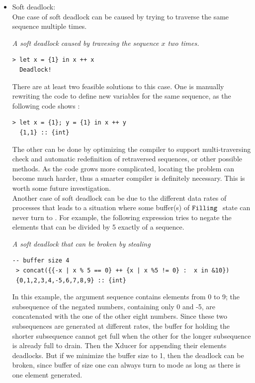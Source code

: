 \begin{itemize}

\item Soft deadlock: \\

One case of soft deadlock can be caused by trying to traverse the same sequence multiple times. 

\begin{example} \emph{A soft deadlock caused by travesing the sequence $x$ two times.} \label{eg:deadlock1}
\end{example}
	\begin{lstlisting}[style=nesl-style]
  > let x = {1} in x ++ x
  Deadlock!
\end{lstlisting}

There are at least two feasible solutions to this case.
One is manually rewriting the code to define new variables for the same sequence, as the following code shows :\\

\begin{lstlisting}[style=nesl-style]
  > let x = {1}; y = {1} in x ++ y
  {1,1} :: {int}
\end{lstlisting}


The other can be done by optimizing the compiler to support multi-traversing check and automatic 
redefinition of retraversed sequences, or other possible methods. 
As the code grows more complicated, locating the problem can become much harder, thus a smarter compiler is definitely necessary. 
This is worth some future investigation.\\


Another case of soft deadlock can be due to the different data rates of processes that leads to a situation where some buffer(s) of $\texttt{Filling} \ $ state can never turn to \draining. 
For example, the following expression tries to negate the elements that can be divided by 5 exactly of a sequence.
\begin{example}\emph{ A soft deadlock that can be broken by stealing}
\end{example}
\begin{lstlisting}[style=nesl-style]
  -- buffer size 4 
 > concat({{-x | x % 5 == 0} ++ {x | x %5 != 0} :  x in &10})
 {0,1,2,3,4,-5,6,7,8,9} :: {int}
\end{lstlisting}

In this example, the argument sequence contains elements from 0 to 9; the subsequence of the negated numbers, containing only 0 and -5, are concatenated with the one of the other eight numbers. 
Since these two subsequences are generated at different rates,
the buffer for holding the shorter subsequence cannot get full when the other for the longer subsequence is already full to drain.
Then the Xducer for appending their elements deadlocks.
But if we minimize the buffer size to 1, then the deadlock can be broken, since buffer of size one can always turn to \draining mode as long as there is one element generated. 


\end{itemize}

